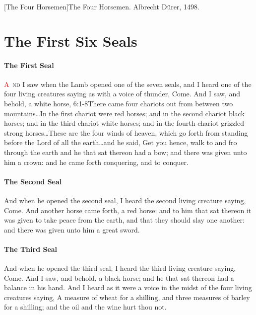 [The Four Horsemen]{The Four Horsemen. Albrecht Dürer, 1498.}

\chapter{The First Six Seals}
\subsubsection*{The First Seal}
\lettrine[lines=3]{\textcolor{red}{A}}{\ nd} I saw when the Lamb opened one of the seven seals, and I heard one of the four living creatures saying as with a voice of thunder, Come. 
And I saw, and behold, a white horse,%
					{6:1-8}{There came four chariots out from between two mountains\ldots In the first chariot were red horses; and in the second chariot black horses; and in the third chariot white horses; and in the fourth chariot grizzled strong horses\ldots These are the four winds of heaven, which go forth from standing before the Lord of all the earth\ldots and he said, Get you hence, walk to and fro through the earth}
 and he that sat thereon had a bow; and there was given unto him a crown: and he came forth conquering, and to conquer.
\subsubsection*{The Second Seal}
And when he opened the second seal, I heard the second living creature saying, Come. %
And another horse came forth, a red horse: and to him that sat thereon it was given to take peace from the earth, and that they should slay one another: and there was given unto him a great sword.
\subsubsection*{The Third Seal}
And when he opened the third seal, I heard the third living creature saying, Come. And I saw, and behold, a black horse; and he that sat thereon had a balance in his hand. %
 And I heard as it were a voice in the midst of the four living creatures saying, A measure of wheat for a shilling, and three measures of barley for a shilling; and the oil and the wine hurt thou not.
